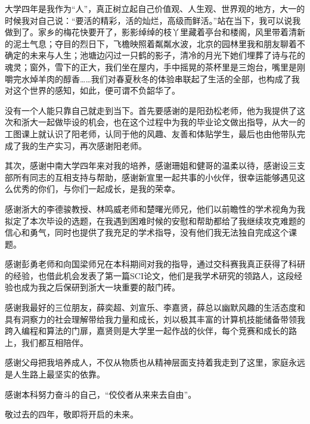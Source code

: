 \begin{acknowledgements} 

大学四年是我作为“人”，真正树立起自己价值观、人生观、世界观的地方，大一的时候我对自己说：“要活的精彩，活的灿烂，高级而鲜活。”站在当下，我可以说我做到了。家乡的梅花快要开了，影影绰绰的枝丫里藏着亭台和楼阁，风里带着清新的泥土气息；夺目的烈日下，飞檐映照着粼粼水波，北京的园林里我和朋友聊着不确定的未来与人生；池塘边闪过一只鹤的影子，清冷的月光下她们埋葬了诗与花的魂灵；窗外，雪下的正大，我们坐在屋内，手中摇晃的茶杯里是三炮台，嘴里是刚嚼完水焯羊肉的醇香……我们对春夏秋冬的体验串联起了生活的全部，也构成了我对这个世界的感知，如此，便可谓不负韶华了。

没有一个人能只靠自己就走到当下。首先要感谢的是阳劲松老师，他为我提供了这次和浙大一起做毕设的机会，也在这个过程中为我的毕业论文做出指导，从大一的工图课上就认识了阳老师，认同于他的风趣、友善和体贴学生，最后也由他带队完成了我的生产实习，再次感谢阳老师。

其次，感谢中南大学四年来对我的培养，感谢珊姐和健哥的温柔以待，感谢设三支部所有同志的互相支持与帮助，感谢新宣里一起共事的小伙伴，很幸运能够遇见这么优秀的你们，与你们一起成长，是我的荣幸。

感谢浙大的李德骏教授、林鸣威老师和楚曙光师兄，他们以前瞻性的学术视角为我拟定了本次毕设的选题，在我遇到困难时候的安慰和帮助都给了我继续攻克难题的信心和勇气，同时也提供了我充足的学术指导，没有他们我无法独自完成这个课题。

感谢彭勇老师和向国梁师兄在本科期间对我的指导，通过交科赛我真正获得了科研的经验，也借此机会发表了第一篇SCI论文，他们是我学术研究的领路人，这段经验也成为我之后保研到浙大一块重要的敲门砖。

感谢我最好的三位朋友，薛奕超、刘宣乐、李嘉贤，薛总以幽默风趣的生活态度和具有洞察力的社会理解带给我力量和成长，刘以极其丰富的计算机技能储备带领我跨入编程和算法的门扉，嘉贤则是大学里一起作战的伙伴，每个竞赛和成长的路上，我们都互相陪伴。

感谢父母把我培养成人，不仅从物质也从精神层面支持着我走到了这里，家庭永远是人生路上最坚实的依靠。

感谢本科努力奋斗的自己，“佼佼者从来来去自由”。

敬过去的四年，敬即将开启的未来。

\end{acknowledgements}

